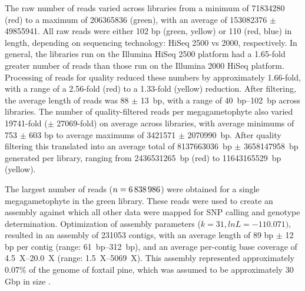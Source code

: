 \documentclass[smallextended]{svjour3}
\begin{document}
The raw number of reads varied across libraries from a minimum of \num{71834280}
(red) to a maximum of \num{206365836} (green), with an average of
\num{153082376} $\pm$ \num{49855941}. All raw reads were either 102 bp (green,
yellow) or 110 (red, blue) in length, depending on sequencing technology: HiSeq
2500 vs 2000, respectively. In general, the libraries run on the Illumina HiSeq
2500 platform had a \num{1.65}-fold greater number of reads than those run on
the Illumina 2000 HiSeq platform. Processing of reads for quality reduced these
numbers by approximately \num{1.66}-fold, with a range of a \num{2.56}-fold
(red) to a \num{1.33}-fold (yellow) reduction. After filtering, the average
length of reads was 88 $\pm$ \SI{13}{bp}, with a range of \SIrange{40}{102}{bp}
across libraries.  The number of quality-filtered reads per megagametophyte also
varied \num{19741}-fold ($\pm$ \num{27069}-fold) on average across libraries,
with average minimums of 753 $\pm$ 603 bp to average maximums of \num{3421571}
$\pm$ \SI{2070990}{bp}. After quality filtering this translated into an average
total of \SI{8137663036}{bp} $\pm$ \SI{3658147958}{bp} generated per library,
ranging from \SI{2436531265}{bp} (red) to \SI{11643165529}{bp} (yellow).

The largest number of reads ($n=\text{\num{6838986}}$) were obtained for a
single megagametophyte in the green library. These reads were used to create an
assembly against which all other data were mapped for SNP calling and genotype
determination. Optimization of assembly parameters ($k=31, lnL=-110.071)$,
resulted in an assembly of \num{231053} contigs, with an average length of 89 bp
$\pm$ 12 bp per contig (range: \SIrange {61}{312}{bp}), and an average
per-contig base coverage of \SIrange{4.5}{20.0}{X} (range:
\SIrange{1.5}{5069}{X}). This assembly represented approximately 0.07\% of the
genome of foxtail pine, which was assumed to be approximately 30 Gbp in size
\citep{Murray:1998}.
\end{document}
